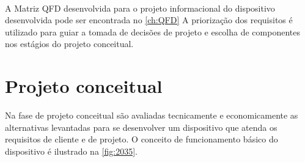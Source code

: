 \begin{table}[H]
    \caption{Prioridade dos requisitos definidos pela matriz QFD}
    \label{tab:resultqfd}
    \centering
\
\end{table}

A Matriz QFD desenvolvida para o projeto informacional do dispositivo desenvolvida pode ser encontrada no \autoref{ch:QFD}
A priorização dos requisitos é utilizado para guiar a tomada de decisões de projeto e escolha de componentes nos estágios do projeto conceitual.

\section{Projeto conceitual}

Na fase de projeto conceitual são avaliadas tecnicamente e economicamente as alternativas levantadas para se desenvolver um dispositivo que atenda os requisitos de cliente e de projeto.
O conceito de funcionamento básico do dispositivo é ilustrado na \autoref{fig:2035}.

